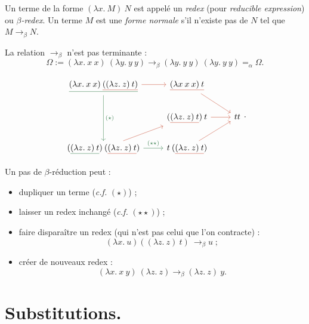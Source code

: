 \documentclass[./main]{subfiles}
\begin{document}
  \begin{defn}
    Un terme de la forme $(\lambda x. \: M)\: N$ est appelé un  \textit{redex} (pour \textit{reducible expression}) ou  \textit{$\beta$-redex}.
    Un terme $M$ est une \textit{forme normale}  s'il n'existe pas de $N$ tel que $M \to_\beta N$.
  \end{defn}

  \begin{rmk}
    La relation $\to_\beta$ n'est pas terminante :
    \[
      \Omega := (\lambda x.\: x \: x) \: (\lambda y.\: y \: y) \to_\beta (\lambda y.\: y \: y) \: (\lambda y.\: y \: y) =_\alpha \Omega
    .\] 
  \end{rmk}

  \begin{exm} \label{exm:multiple-paths-beta}
    \[
    \begin{tikzcd}
      \colorunderline{deepgreen}{(\lambda x.\: x \: x) \: \colorunderline{nicered}{((\lambda z.\: z) \: t)}}
      \arrow[deepgreen]{dd}{(\star)}
      \arrow[nicered]{r}{}
      & \arrow[nicered]{dr}{} \colorunderline{nicered}{(\lambda x\: x \: x) \: t}\\
      & (\colorunderline{nicered}{(\lambda z.\: z)\: t}) \: t \arrow[nicered]{r}{} & t t\\
      (\colorunderline{deepgreen}{(\lambda z.\: z) \: t}) \: (\colorunderline{nicered}{(\lambda z.\: z) \: t}) \arrow[deepgreen]{r}{(\star\star)} \arrow[nicered]{ur}{} & t \: (\colorunderline{nicered}{(\lambda z.\: z)\: t}) \arrow[nicered]{ur}{}
    \end{tikzcd}
    .\]
  \end{exm}

  Un pas de $\beta$-réduction peut :
  \begin{itemize}
    \item dupliquer un terme (\textit{c.f.} $(\star)$) ;
    \item laisser un redex inchangé (\textit{c.f.} $(\star\star)$) ;
    \item faire disparaître un redex (qui n'est pas celui que l'on contracte) :
      \[
        (\lambda x. \: u) ((\lambda z. \: z) \: t) \: \to_\beta u \;
      ;\]
    \item créer de nouveaux redex :
      \[
        (\lambda x. \: x \: y) \: (\lambda z. \: z) \to_\beta (\lambda z. \: z)\: y
      .\]
  \end{itemize}

  \section{Substitutions.}
\end{document}
